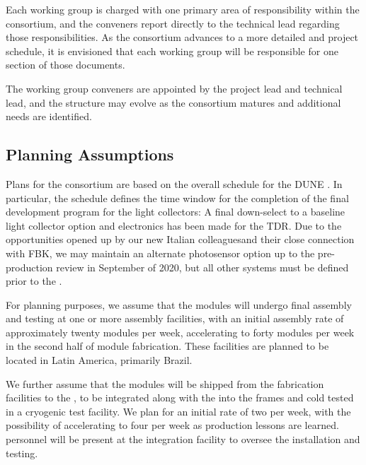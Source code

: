 Each working group is charged with one primary area of responsibility within the consortium, and the conveners report directly to the technical lead regarding those responsibilities.  As the consortium advances to a more detailed  and project schedule, it is envisioned that each working group will be responsible for one section of those documents.

The working group conveners are appointed by the  project lead and technical lead, and the structure may evolve as the consortium matures and additional needs are identified. 

\subsection{Planning Assumptions}
\label{sec:fdsp-pd-org-assmp}

Plans for the  consortium are based on the overall schedule for the DUNE . In particular, the  schedule defines the time window for the completion of the final development program for the light collectors: A final down-select to a baseline light collector option and  electronics has been made for the TDR.  Due to the opportunities opened up by our new Italian colleaguesand their close connection with FBK, we may maintain an alternate photosensor option up to the pre-production review in September of 2020, but all other systems must be defined prior to the .

For planning purposes, we assume that the  modules will undergo final assembly and testing at one or more  assembly facilities, with an initial  assembly rate of approximately twenty modules per week, accelerating to forty modules per week in the second half of module fabrication.  These facilities are planned to be located in Latin America, primarily Brazil.

We further assume that the modules will be shipped from the fabrication facilities to the , 
to be integrated along with the  into the  frames and cold tested in a cryogenic test facility.  We plan for an initial rate of two  per week, with the possibility of accelerating to four  per week as production lessons are learned.   personnel will be present at the integration facility to oversee the installation and testing.


